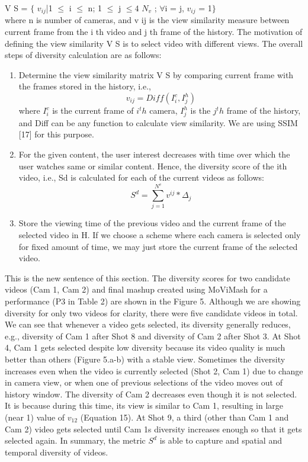 \documentclass{sig-alternate}
\begin{document}
{{{V S = $\{$ $v_{ij}$|1 $\leq$ i $\leq$ n; 1 $\leq$ j $\leq4$ $N_v$ ; $\forall$i = j, $v_{ij}$ = 1$\}$\\


where n is number of cameras, and v ij is the view similarity
measure between current frame from the i th video and j th frame
of the history. The motivation of defining the view similarity V S is
to select video with different views. The overall steps of diversity
calculation are as follows:
\begin{enumerate}
    \item Determine the view similarity matrix V S by comparing current
frame with the frames stored in the history, i.e.,
$$
  v_{ij}=Diff({I^c_i},{I^h_j})
$$
where $I^c_i$ is the current frame of $i^th$ camera, $I^h_j$ is the $j^th$
frame of the history, and Diff can be any function to calculate
view similarity. We are using SSIM [17] for this purpose.

  \item For the given content, the user interest decreases with time
over which the user watches same or similar content. Hence,
the diversity score of the ith video, i.e., Sd is calculated for
each of the current videos as follows:
$$
  S^d=\sum^{N^v}_{j=1}v^{ij}*\Delta_j
$$
   \item Store the viewing time of the previous video and the current
frame of the selected video in H. If we choose a scheme
where each camera is selected only for fixed amount of time,
we may just store the current frame of the selected video.
\end{enumerate}
This is the new sentence of this section.
The diversity scores for two candidate videos (Cam 1, Cam 2)
and final mashup created using MoViMash for a performance (P3
in Table 2) are shown in the Figure 5. Although we are showing
diversity for only two videos for clarity, there were five candidate
videos in total. We can see that whenever a video gets selected,
its diversity generally reduces, e.g., diversity of Cam 1 after Shot 8
and diversity of Cam 2 after Shot 3. At Shot 4, Cam 1 gets selected
despite low diversity because its video quality is much better than
others (Figure 5.a-b) with a stable view. Sometimes the diversity
increases even when the video is currently selected (Shot 2, Cam 1)
due to change in camera view, or when one of previous selections
of the video moves out of history window. The diversity of Cam 2
decreases even though it is not selected. It is because during this
time, its view is similar to Cam 1, resulting in large (near 1) value
of $v_12$ (Equation 15). At Shot 9, a third (other than Cam 1 and Cam
2) video gets selected until Cam 1s diversity increases enough so
that it gets selected again. In summary, the metric $S^d$ is able to
capture and spatial and temporal diversity of videos.

}}}
\end{document}
